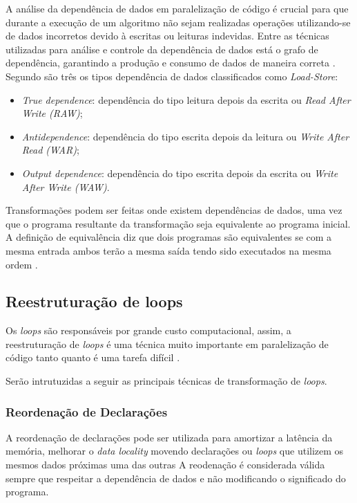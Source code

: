 \documentclass[12pt]{article}
\begin{document}
A análise da dependência de dados em paralelização de código é crucial para que 
durante a execução de um algoritmo não sejam realizadas operações utilizando-se 
de dados incorretos devido à escritas ou leituras indevidas. 
Entre as técnicas utilizadas para análise e controle da dependência de dados 
está o grafo de dependência, garantindo a produção e consumo de dados de maneira 
correta \cite{aapc}.
Segundo \cite{ocfma} são três os tipos dependência de dados classificados 
como \textit{Load-Store}:
\begin{itemize}
        \item \textit{True dependence}: dependência do tipo leitura depois da 
                escrita ou \textit{Read After Write (RAW)};
        \item \textit{Antidependence}: dependência do tipo escrita depois da 
                leitura ou \textit{Write After Read (WAR)};
        \item \textit{Output dependence}: dependência do tipo escrita depois da 
                escrita ou \textit{Write After Write (WAW)}.
\end{itemize}
Transformações podem ser feitas onde existem dependências de dados, uma vez que 
o programa resultante da transformação seja equivalente ao programa inicial. 
A definição de equivalência diz que dois programas são equivalentes se com a 
mesma entrada ambos terão a mesma saída tendo sido executados na mesma 
ordem \cite{ocfma}.

\subsection{Reestruturação de loops}

Os \textit{loops} são responsáveis por grande custo computacional, assim, a 
reestruturação de \textit{loops} é uma técnica muito importante em paralelização 
de código tanto quanto é uma tarefa difícil \cite{Huang2000259}.

Serão intrutuzidas a seguir as principais técnicas de transformação de 
\textit{loops}.

\subsubsection{Reordenação de Declarações}

A reordenação de declarações pode ser utilizada para amortizar a latência da 
memória, melhorar o \textit{data locality} movendo declarações ou \textit{loops}
que utilizem os mesmos dados próximas uma das outras \cite{McKinley:1996}
A reodenação é considerada válida sempre que respeitar a dependência de dados e 
não modificando o significado do programa.
\end{document}
